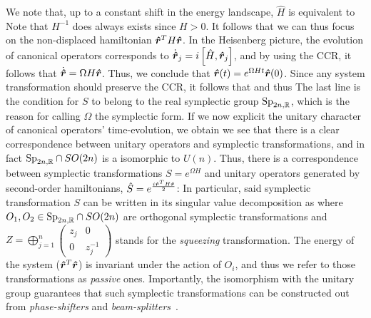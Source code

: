 We note that, up to a constant shift in the energy landscape, $\hat{H}$ is equivalent to
Note that $H^{-1}$ does always exists since $H>0$. It follows that
we can thus focus on the non-displaced hamiltonian $\bm{\hat{r}}^T H \bm{\hat{r}}$. In the Heisenberg picture, the evolution of canonical operators corresponds to $\dot{\bm{\hat{r}}}_j = i \left[\hat{H},\bm{\hat{r}}_j\right]$, and by using the CCR, it follows that $\dot{\bm{\hat{r}}} = \Omega H \bm{\hat{r}}$. Thus, we conclude that $\bm{\hat{r}}(t) = e^{\Omega H t} \bm{\hat{r}}(0)$.
Since any system transformation should preserve the CCR, it follows that
and thus
The last line is the condition for $S$ to belong to the real symplectic group $\text{Sp}_{2n,\mathbb{R}}$, which is the reason for calling $\Omega$ the symplectic form. If we now explicit the unitary character of canonical operators' time-evolution, we obtain
we see that there is a clear correspondence between unitary operators and symplectic transformations, and in fact $\text{Sp}_{2n,\mathbb{R}} \cap SO(2n)$ is a isomorphic to $U(n)$. Thus, there is a correspondence between symplectic transformations $S=e^{\Omega H}$ and unitary operators generated by second-order hamiltonians, $\hat{S}=e^{\frac{i \bm{\hat{r}}^T H \bm{\hat{r}}}{2}}$:
In particular, said symplectic transformation $S$ can be written in its singular value decomposition as
where $O_1, O_2 \in \text{Sp}_{2n,\mathbb{R}}\cap SO(2n)$ are orthogonal symplectic transformations and $Z = \bigoplus_{j=1}^{n}\begin{pmatrix}z_j&0\\0&z_j^{-1}\end{pmatrix}$ stands for the \textit{squeezing} transformation. The energy of the system ($\bm{\hat{r}}^T\bm{\hat{r}}$) is invariant under the action of $O_i$, and thus we refer to those transformations as \textit{passive} ones. Importantly, the isomorphism with the unitary group guarantees that such symplectic transformations can be constructed out from \textit{phase-shifters} and \textit{beam-splitters}~\cite{Reck1994Experimental,Weedbrook2012Gaussian}.

